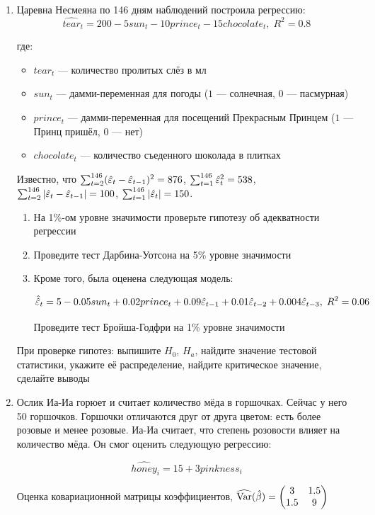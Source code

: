 \documentclass[12pt, a4paper]{article}\usepackage[]{graphicx}\usepackage[]{color}
\begin{document}
\begin{enumerate}
\item Царевна Несмеяна по 146 дням наблюдений построила регрессию:
\[
\widehat{tear}_t = 200 - 5 sun_t - 10 prince_t - 15 chocolate_t, \; R^2 = 0.8
\]

где:
\begin{itemize}
\item $tear_t$ — количество пролитых слёз в мл
\item $sun_t$ — дамми-переменная для погоды ($1$ — солнечная, $0$ — пасмурная)
\item $prince_t$ — дамми-переменная для посещений Прекрасным Принцем ($1$ — Принц пришёл, $0$ — нет)
\item $chocolate_t$ — количество съеденного шоколада в плитках
\end{itemize}



Известно, что $\sum_{t=2}^{146} (\hat{\varepsilon}_t - \hat{\varepsilon}_{t-1})^2 = 876$, $\sum_{t=1}^{146} \hat{\varepsilon}_t^2 = 538$, $\sum_{t=2}^{146} |\hat{\varepsilon}_t - \hat{\varepsilon}_{t-1}| = 100$, $\sum_{t=1}^{146} |\hat{\varepsilon}_t| = 150$.

\begin{enumerate}
\item На 1\%-ом уровне значимости проверьте гипотезу об адекватности регрессии
\item Проведите тест Дарбина-Уотсона на 5\% уровне значимости
\item Кроме того, была оценена следующая модель:

\[
\hat{\hat{\varepsilon}}_t = 5 - 0.05 sun_t + 0.02 prince_t + 0.09 \hat{\varepsilon}_{t-1} + 0.01 \hat{\varepsilon}_{t-2} + 0.004 \hat{\varepsilon}_{t-3}, \; R^2 = 0.06
\]

Проведите тест Бройша-Годфри на 1\% уровне значимости
\end{enumerate}

При проверке гипотез: выпишите $H_0$, $H_a$, найдите значение тестовой статистики, укажите её распределение, найдите критическое значение, сделайте выводы


\item Ослик Иа-Иа горюет и считает количество мёда в горшочках. Сейчас у него 50 горшочков. Горшочки отличаются друг от друга цветом: есть более розовые и менее розовые. Иа-Иа считает, что степень розовости влияет на количество мёда. Он смог оценить следующую регрессию:

\[
\widehat{honey}_i = 15 + 3 pinkness_i
\]

Оценка ковариационной матрицы коэффициентов,
$\widehat{\operatorname{Var}}(\hat{\beta}) = \begin{pmatrix}
3 & 1.5 \\
1.5 & 9 \\
\end{pmatrix}$


\end{enumerate}
\end{document}
